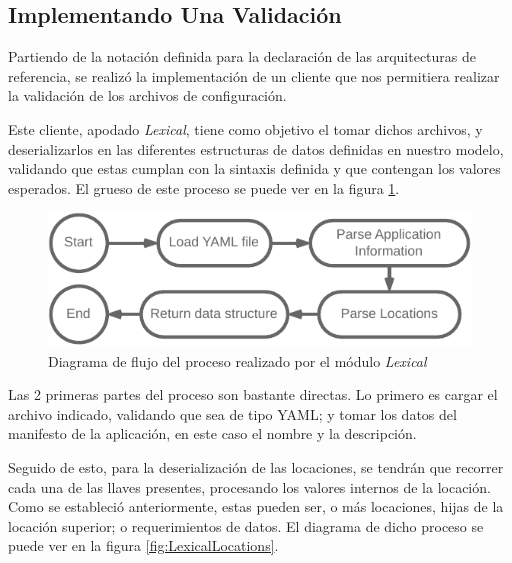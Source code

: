 \subsection{Implementando Una Validación}


Partiendo de la notación definida para la declaración de las arquitecturas de referencia, se realizó la implementación de un cliente que nos permitiera realizar la validación de los archivos de configuración.

Este cliente, apodado \textit{Lexical}, tiene como objetivo el tomar dichos archivos, y deserializarlos en las diferentes estructuras de datos definidas en nuestro modelo, validando que estas cumplan con la sintaxis definida y que contengan los valores esperados. El grueso de este proceso se puede ver en la figura \ref*{fig:LexicalFlow}.

\begin{figure}[ht]
    \centering
    \caption{Diagrama de flujo del proceso realizado por el módulo \textit{Lexical}}
    \label{fig:LexicalFlow}
    \vspace{2mm}
    \includegraphics[width=0.75\linewidth]{images/LexicalFlow.pdf}
\end{figure}

Las 2 primeras partes del proceso son bastante directas. Lo primero es cargar el archivo indicado, validando que sea de tipo YAML; y tomar los datos del manifesto de la aplicación, en este caso el nombre y la descripción.

Seguido de esto, para la deserialización de las locaciones, se tendrán que recorrer cada una de las llaves presentes, procesando los valores internos de la locación. Como se estableció anteriormente, estas pueden ser, o más locaciones, hijas de la locación superior; o requerimientos de datos. El diagrama de dicho proceso se puede ver en la figura \ref{fig:LexicalLocations}.

